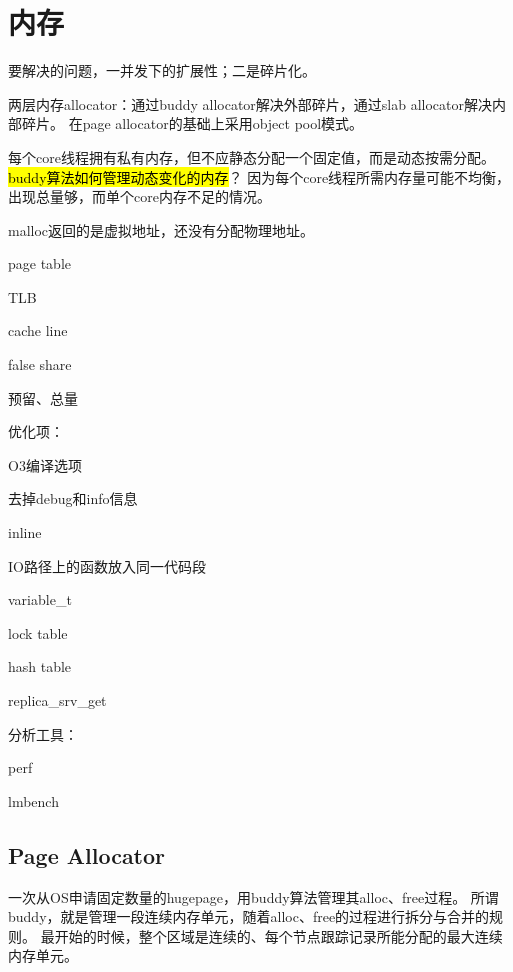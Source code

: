 \section{内存}

要解决的问题，一并发下的扩展性；二是碎片化。

两层内存allocator：通过buddy allocator解决外部碎片，通过slab allocator解决内部碎片。
在page allocator的基础上采用object pool模式。

每个core线程拥有私有内存，但不应静态分配一个固定值，而是动态按需分配。
\hl{buddy算法如何管理动态变化的内存}？
因为每个core线程所需内存量可能不均衡，出现总量够，而单个core内存不足的情况。

malloc返回的是虚拟地址，还没有分配物理地址。

\begin{enumbox}
\item page table
\item TLB
\item cache line
\item false share
\end{enumbox}

预留、总量

优化项：
\begin{enumbox}
\item O3编译选项
\item 去掉debug和info信息
\item inline
\item IO路径上的函数放入同一代码段
\item variable\_t
\item lock table
\item hash table
\item replica\_srv\_get
\end{enumbox}

分析工具：
\begin{enumbox}
\item perf
\item lmbench
\end{enumbox}

\subsection{Page Allocator}

一次从OS申请固定数量的hugepage，用buddy算法管理其alloc、free过程。
所谓buddy，就是管理一段连续内存单元，随着alloc、free的过程进行拆分与合并的规则。
最开始的时候，整个区域是连续的、每个节点跟踪记录所能分配的最大连续内存单元。

